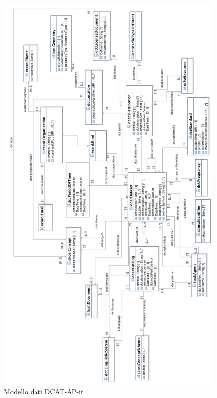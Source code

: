 \documentclass{article}
\theoremstyle{plain}
\theoremstyle{definition}
\begin{document}
\begin{figure}[htbp]
\begin{center}
\includegraphics[scale=0.40]{img/DCAT-AP_IT_UML.png}
\caption{Modello dati DCAT-AP-it}
\end{center}
\end{figure}
\end{document}
